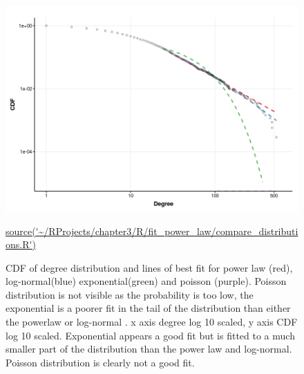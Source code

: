 \begin{figure}
    \centering
    \includegraphics[width=\textwidth]{images/chapter3/poweRlaw/Rplot_models_xmin.png}
    \caption{CDF of degree distribution and lines of best fit for power law (red), log-normal(blue) exponential(green) and poisson (purple). Poisson distribution is not visible as the probability is too low, the exponential is a poorer fit in the tail of the distribution than either the powerlaw or log-normal . x axis degree log 10 scaled, y axis CDF log 10 scaled. Exponential appears a good fit but is fitted to a much smaller part of the distribution than the power law and log-normal. Poisson distribution is clearly not a good fit.}
    \small\url{source('~/RProjects/chapter3/R/fit_power_law/compare_distributions.R')}
    \label{fig:models_set_xmin}
\end{figure}


